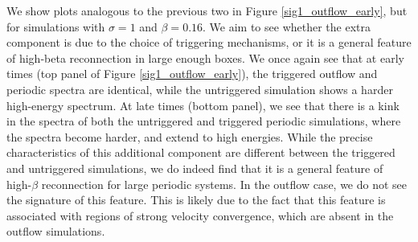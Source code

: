 We show plots analogous to the previous two in Figure \ref{sig1_outflow_early}, but for simulations with $\sigma=1$ and $\beta=0.16$.  We aim to see whether the extra component is due to the choice of triggering mechanisms, or it is a general feature of high-beta reconnection in large enough boxes.  We once again see that at early times (top panel of Figure \ref{sig1_outflow_early}), the triggered outflow and periodic spectra are identical, while the untriggered simulation shows a harder high-energy spectrum.  At late times (bottom panel), we see that there is a kink in the spectra of both the untriggered and triggered periodic simulations, where the spectra become harder, and extend to high energies.  While the precise characteristics of this additional component are different between the triggered and untriggered simulations, we do indeed find that it is a general feature of high-$\beta$ reconnection for large periodic systems.  In the outflow case, we do not see the signature of this feature.  This is likely due to the fact that this feature is associated with regions of strong velocity convergence, which are absent in the outflow simulations.






